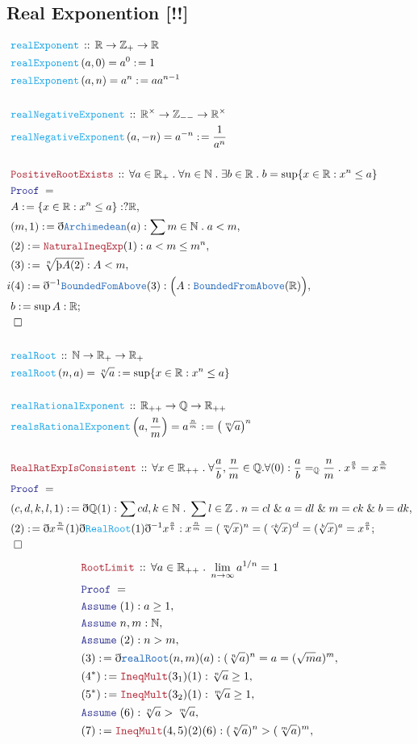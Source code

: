 \documentclass[12pt]{scrartcl}
\newcommand{\TYPE}[1]{\textcolor{NavyBlue}{\mathtt{#1}}}
\newcommand{\FUNC}[1]{\textcolor{Cerulean}{\mathtt{#1}}}
\newcommand{\LOGIC}[1]{\textcolor{Blue}{\mathtt{#1}}}
\newcommand{\THM}[1]{\textcolor{Maroon}{\mathtt{#1}}}
\renewcommand{\.}{\; . \;}
\newcommand{\de}{: \kern 0.1pc =}
\newcommand{\Act}[1]{\left( #1 \right)}
\newcommand{\Theorem}[2]{& \THM{#1} \, :: \, #2 \\ & \Proof = \\ }
\newcommand{\DeclareFunc}[2]{& \FUNC{#1} \, :: \, #2 \\}
\newcommand{\DefineNamedFunc}[4]{&  \FUNC{#1}\Act{#2} = #3 \de #4 \\}
\newcommand{\Page}[1]{ \begin{align*} #1 \end{align*}   }
\newcommand{ \bd }{ \ByDef }
\renewcommand{\And}{\; \& \;}
\newcommand{\Int}{\mathbb{Z} }
\newcommand{\Reals}{\mathbb{R} }
\newcommand{\Rats}{\mathbb{Q} }
\newcommand{\Nat}{\mathbb{N} }
\newcommand{\Say}[3]{& #1 \de #2 : #3, \\}
\newcommand{\Conclude}[3]{& #1 \de #2 : #3; \\}
\newcommand{\Assume}[2]{& \LOGIC{Assume} \;#1 : #2, \\}
\newcommand{\QED}{\; \square}
\newcommand{\EndProof}{& \QED \\}
\newcommand{\ByDef}{\eth}
\newcommand{\ByConstr}{\text{\thorn}}
\newcommand{\Proof}{\LOGIC{Proof} \; }
\begin{document}
\subsection{Real Exponention [!!]}
\Page{
	\DeclareFunc{realExponent}{ \Reals \to \Int_+ \to \Reals }
	\DefineNamedFunc{realExponent}{ a,0  }{ a^0 }{1}
	\DefineNamedFunc{realExponent}{ a,n  }{ a^n }{ aa^{n - 1} }
	\\
	\DeclareFunc{realNegativeExponent}{\Reals^\times \to \Int_{--} \to \Reals^\times}
	\DefineNamedFunc{realNegativeExponent}{ a,-n  }{a^{-n}}{\frac{1}{a^{n}}}
	\\
	\Theorem{PositiveRootExists}{\forall a \in \Reals_+  \. \forall n \in \Nat \.   
	  \exists  b \in \Reals \. b = \sup \{ x \in \Reals : x^n \le a \}
	}
	\Say{A}{ \{ x \in \Reals : x^n \le a    \} }{   ?\Reals  }
	\Say{(m,  1)}{\bd \TYPE{Archimedean}(a)}{ \sum m \in \Nat \. a < m}
	\Say{(2)}{ \THM{NaturalIneqExp}(1)   }{ a < m  \le  m^n  }
	\Say{(3)}{ \sqrt[n]{ \ByConstr A (2)}}{  A < m }i
	\Say{(4)}{ \bd^{-1} \TYPE{BoundedFomAbove} (3) }{\Big( A : \TYPE{BoundedFromAbove}(\Reals) \Big)}
	\Conclude{b}{\sup A}{\Reals}
	\EndProof
	\\
	\DeclareFunc{realRoot}{ \Nat \to \Reals_+ \to \Reals_+ }
	\DefineNamedFunc{realRoot}{n,a}{\sqrt[n]{a}}{ \sup \{ x \in \Reals : x^n \le a \} }
	\\
	\DeclareFunc{realRationalExponent}{\Reals_{++} \to \Rats \to \Reals_{++}}
	\DefineNamedFunc{realsRationalExponent}{ a, \frac{n}{m}   }{ a^{\frac{n}{m}}  }{ \left( \sqrt[m]{a} \right)^n}
	\\
	\Theorem{RealRatExpIsConsistent}{\forall x \in \Reals_{++} \. \forall \frac{a}{b}, \frac{n}{m} \in \Rats.
		\forall (0) : \frac{a}{b} =_{\Rats} \frac{n}{m} \.
		x^{\frac{a}{b}} = x^{\frac{n}{m}}
	}
	\Say{(c,d,k,l,1)}{ \bd \Rats (1) }{\sum c d, k \in \Nat \. \sum l \in \Int \.  
		n = {cl} \And a = dl \And m = ck \And b = dk }
	\Conclude{(2)}{\bd x^{\frac{n}{m}}(1)\bd \FUNC{RealRoot}(1)\bd^{-1} x^{\frac{a}{b}}}{ 
		x^{\frac{n}{m}} = ( \sqrt[m]{x} )^n  = (\sqrt[ck]{x} )^{cl} = (\sqrt[b]{x})^a = x^{\frac{a}{b}}  }
	\EndProof
} \Page{
	\Theorem{RootLimit}{\forall a \in \Reals_{++} \.  \lim_{n \to \infty} a^{1/n} = 1}
	\Assume{(1)}{a \ge 1}
	\Assume{n,m}{\Nat}
	\Assume{(2)}{ n > m }
	\Say{(3)}{\bd \TYPE{realRoot}(n,m)(a)}{ (\sqrt[n]{a})^n = a = (\sqrt{m}{a})^m }
	\Say{(4^*)}{\THM{IneqMult}(3_1)(1)}{ \sqrt[n]{a} \ge 1   }
	\Say{(5^*)}{\THM{IneqMult}(3_2)(1)}{\sqrt[m]{a} \ge 1  }
	\Assume{(6)}{\sqrt[n]{a} > \sqrt[m]{a}}
	\Say{(7)}{\THM{IneqMult}(4,5)(2)(6)}{  (\sqrt[n]{a})^n > (\sqrt[m]{a})^m }
}
\end{document}
